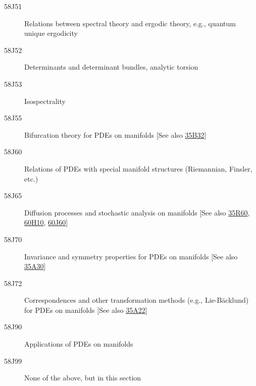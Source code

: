 \begin{description}
\item [58J51]\label{58J51} Relations between spectral theory and ergodic theory, e.g., quantum unique ergodicity
\item [58J52]\label{58J52} Determinants and determinant bundles, analytic torsion
\item [58J53]\label{58J53} Isospectrality
\item [58J55]\label{58J55} Bifurcation theory for PDEs on manifolds [See also \hyperref[35B32]{35B32}]
\item [58J60]\label{58J60} Relations of PDEs with special manifold structures (Riemannian, Finsler, etc.)
\item [58J65]\label{58J65} Diffusion processes and stochastic analysis on manifolds [See also \hyperref[35R60]{35R60}, \hyperref[60H10]{60H10}, \hyperref[60J60]{60J60}]
\item [58J70]\label{58J70} Invariance and symmetry properties for PDEs on manifolds [See also \hyperref[35A30]{35A30}]
\item [58J72]\label{58J72} Correspondences and other transformation methods (e.g., Lie-B\"{a}cklund) for PDEs on manifolds [See also \hyperref[35A22]{35A22}]
\item [58J90]\label{58J90} Applications of PDEs on manifolds
\item [58J99]\label{58J99} None of the above, but in this section
\end{description}
